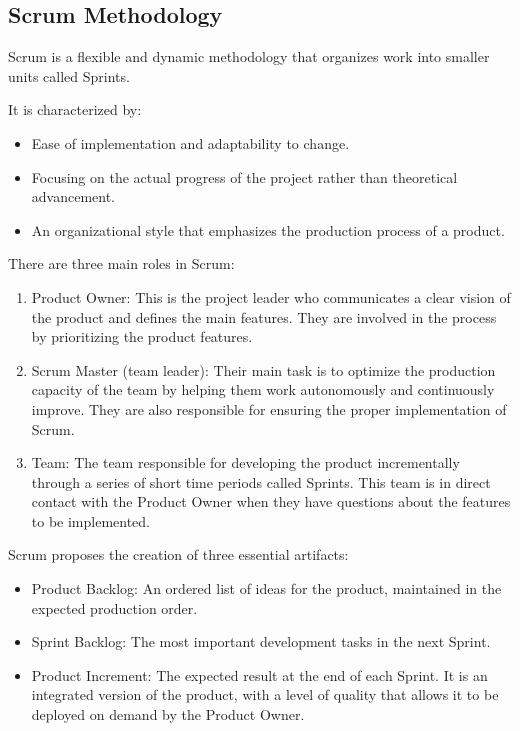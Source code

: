 \subsection{Scrum Methodology}
Scrum is a flexible and dynamic methodology that organizes work into smaller units called Sprints.

It is characterized by:

\begin{itemize}
    \renewcommand\labelitemi{-}
    \item Ease of implementation and adaptability to change.
    \item Focusing on the actual progress of the project rather than theoretical advancement.
    \item An organizational style that emphasizes the production process of a product.
\end{itemize}

There are three main roles in Scrum:

\begin{enumerate}
    \item Product Owner: This is the project leader who communicates a clear vision of the product and defines the main features. They are involved in the process by prioritizing the product features.
    \item Scrum Master (team leader): Their main task is to optimize the production capacity of the team by helping them work autonomously and continuously improve. They are also responsible for ensuring the proper implementation of Scrum.
    \item Team: The team responsible for developing the product incrementally through a series of short time periods called Sprints. This team is in direct contact with the Product Owner when they have questions about the features to be implemented.
\end{enumerate}



Scrum proposes the creation of three essential artifacts:

\begin{itemize}
    \renewcommand\labelitemi{-}
    \item Product Backlog: An ordered list of ideas for the product, maintained in the expected production order.
    \item Sprint Backlog: The most important development tasks in the next Sprint.
    \item Product Increment: The expected result at the end of each Sprint. It is an integrated version of the product, with a level of quality that allows it to be deployed on demand by the Product Owner.
\end{itemize}


